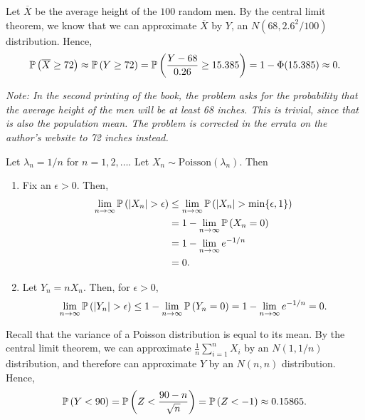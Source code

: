\begin{ex}
  Let $\overline{X}$ be the average height of the $100$ random men. By the
  central limit theorem, we know that we can approximate $\overline{X}$ by $Y$,
  an $N(68, 2.6^2/100)$ distribution. Hence,
  \begin{align*}
    \P{\overline{X}\geq 72}
    \approx \P{Y\geq 72}
    = \P{\frac{Y-68}{0.26}\geq 15.385}
    =1-\Phi(15.385)
    \approx 0.
  \end{align*}

  \noindent
  \textit{Note: In the second printing of the book, the problem asks for the
    probability that the average height of the men will be at least 68 inches.
    This is trivial, since that is also the population mean. The problem is
    corrected in the errata on the author's website to 72 inches instead. }
\end{ex}

\begin{ex}
  Let $\lambda_n=1/n$ for $n=1,2,\ldots$. Let
  $X_n\sim\text{Poisson}(\lambda_n)$. Then
  \begin{enumerate}
    \item Fix an $\epsilon>0$. Then,
          \begin{align*}
            \lim_{n\to\infty}\P{|X_n|>\epsilon}
             & \leq \lim_{n\to\infty}\P{|X_n|>\min\{\epsilon, 1\}} \\
             & =1-\lim_{n\to\infty}\P{X_n=0}                       \\
             & =1-\lim_{n\to\infty}e^{-1/n}                        \\
             & =0.
          \end{align*}
    \item Let $Y_n=nX_n$. Then, for $\epsilon>0$,
          \[
            \lim_{n\to\infty}\P{|Y_n|>\epsilon}
            \leq 1-\lim_{n\to\infty}\P{Y_n=0}
            =1-\lim_{n\to\infty}e^{-1/n}
            =0.
          \]
  \end{enumerate}
\end{ex}

\begin{ex}
  Recall that the variance of a Poisson distribution is equal to its mean. By
  the central limit theorem, we can approximate
  $\frac{1}{n}\sum_{i=1}^n X_i$ by an $N(1, 1/n)$ distribution, and therefore
  can approximate $Y$ by an $N(n, n)$ distribution. Hence,
  \[
    \P{Y<90}
    =\P{Z<\frac{90-n}{\sqrt{n}}}
    =\P{Z<-1}
    \approx 0.15865.
  \]
\end{ex}

